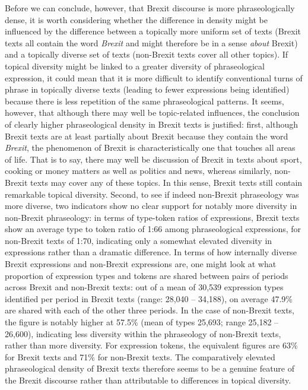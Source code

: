 \documentclass[output=paper]{langscibook}
\begin{document}
Before we can conclude, however, that Brexit discourse is more phraseologically dense, it is worth considering whether the difference in density might be influenced by the difference between a topically more uniform set of texts (Brexit texts all contain the word \textit{Brexit} and might therefore be in a sense \textit{about} Brexit) and a topically diverse set of texts (non-Brexit texts cover all other topics). If topical diversity might be linked to a greater diversity of phraseological expression, it could mean that it is more difficult to identify conventional turns of phrase in topically diverse texts (leading to fewer expressions being identified) because there is less repetition of the same phraseological patterns. It seems, however, that although there may well be topic-related influences, the conclusion of clearly higher phraseological density in Brexit texts is justified: first, although Brexit texts are at least partially about Brexit because they contain the word \textit{Brexit}, the phenomenon of Brexit is characteristically one that touches all areas of life. That is to say, there may well be discussion of Brexit in texts about sport, cooking or money matters as well as politics and news, whereas similarly, non-Brexit texts may cover any of these topics. In this sense, Brexit texts still contain remarkable topical diversity. Second, to see if indeed non-Brexit phraseology was more diverse, two indicators show no clear support for notably more diversity in non-Brexit phraseology: in terms of type-token ratios of expressions, Brexit texts show an average type to token ratio of 1:66 among phraseological expressions, for non-Brexit texts of 1:70, indicating only a somewhat elevated diversity in expressions rather than a dramatic difference. In terms of how internally diverse Brexit expressions and non-Brexit expressions are, one might look at what proportion of expression types and tokens are shared between pairs of periods across Brexit and non-Brexit texts: out of a mean of 30,539 expression types identified per period in Brexit texts (range: 28,040 -- 34,188), on average 47.9\% are shared with each of the other three periods. In the case of non-Brexit texts, the figure is notably higher at 57.5\% (mean of types 25,693; range 25,182 -- 26,600), indicating less diversity within the phraseology of non-Brexit texts, rather than more diversity. For expression tokens, the equivalent figures are 63\% for Brexit texts and 71\% for non-Brexit texts. The comparatively elevated phraseological density of Brexit texts therefore seems to be a genuine feature of the Brexit discourse rather than attributable to differences in topical diversity.
\end{document}
